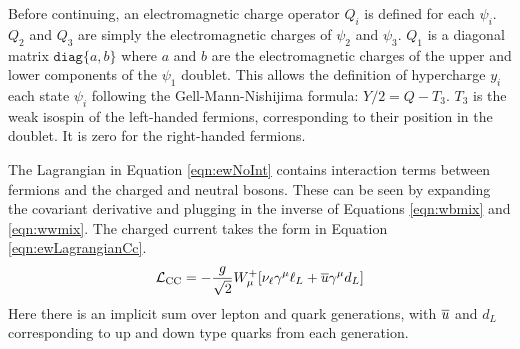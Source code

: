 Before continuing, an electromagnetic charge operator $Q_i$ is defined for each $\psi_i$.
$Q_2$ and $Q_3$ are simply the electromagnetic charges of $\psi_2$ and $\psi_3$.
$Q_1$ is a diagonal matrix $\texttt{diag}\{a,b\}$ where $a$ and $b$ are the electromagnetic charges of the upper and lower components of the $\psi_1$ doublet.
This allows the definition of hypercharge $y_i$ each state $\psi_i$ following the Gell-Mann-Nishijima formula: $Y/2=Q-T_3$.
$T_3$ is the weak isospin of the left-handed fermions, corresponding to their position in the doublet. It is zero for the right-handed fermions.
\cite{pich}

The Lagrangian in Equation \ref{eqn:ewNoInt} contains interaction terms between fermions and the charged and neutral bosons.
These can be seen by expanding the covariant derivative and plugging in the inverse of Equations \ref{eqn:wbmix} and \ref{eqn:wwmix}.
The charged current takes the form in Equation \ref{eqn:ewLagrangianCc}.
\begin{equation}\begin{split}\label{eqn:ewLagrangianCc}
    \mathcal{L}_\text{CC} = -\frac{g}{\sqrt{2}}W_\mu^+[\nu_\ell\gamma^\mu \ell_L+\overline{u}\gamma^\mu d_L]
\end{split}\end{equation}
Here there is an implicit sum over lepton and quark generations, with $\overline{u}$ and $d_L$ corresponding to up and down type quarks from each generation.

